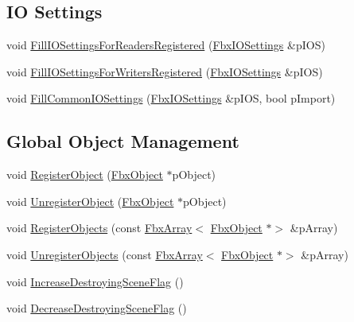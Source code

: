 \subsection*{IO Settings}
\begin{DoxyCompactItemize}
\item 
void \hyperlink{class_fbx_manager_a5af734dedf7cb2c21fc04cfba2265ff3}{Fill\+I\+O\+Settings\+For\+Readers\+Registered} (\hyperlink{class_fbx_i_o_settings}{Fbx\+I\+O\+Settings} \&p\+I\+OS)
\item 
void \hyperlink{class_fbx_manager_aa2cd6f7b73641743427db129ac67d575}{Fill\+I\+O\+Settings\+For\+Writers\+Registered} (\hyperlink{class_fbx_i_o_settings}{Fbx\+I\+O\+Settings} \&p\+I\+OS)
\item 
void \hyperlink{class_fbx_manager_a5d255c3afca682167094c1e78ac1c9aa}{Fill\+Common\+I\+O\+Settings} (\hyperlink{class_fbx_i_o_settings}{Fbx\+I\+O\+Settings} \&p\+I\+OS, bool p\+Import)
\end{DoxyCompactItemize}
\subsection*{Global Object Management}
\begin{DoxyCompactItemize}
\item 
void \hyperlink{class_fbx_manager_a10a8b61fb5b1ba8442c22b5d21a5de53}{Register\+Object} (\hyperlink{class_fbx_object}{Fbx\+Object} $\ast$p\+Object)
\item 
void \hyperlink{class_fbx_manager_a489bd5a18d410b98fcfd87be401c9347}{Unregister\+Object} (\hyperlink{class_fbx_object}{Fbx\+Object} $\ast$p\+Object)
\item 
void \hyperlink{class_fbx_manager_a7a70ec14ac20b239d4fa5e440f70209e}{Register\+Objects} (const \hyperlink{class_fbx_array}{Fbx\+Array}$<$ \hyperlink{class_fbx_object}{Fbx\+Object} $\ast$$>$ \&p\+Array)
\item 
void \hyperlink{class_fbx_manager_ad0efea934848eb58488905b51aa91b38}{Unregister\+Objects} (const \hyperlink{class_fbx_array}{Fbx\+Array}$<$ \hyperlink{class_fbx_object}{Fbx\+Object} $\ast$$>$ \&p\+Array)
\item 
void \hyperlink{class_fbx_manager_ad0c6b924a178ca43748a4e2ee3d6462a}{Increase\+Destroying\+Scene\+Flag} ()
\item 
void \hyperlink{class_fbx_manager_a8967a8b28f427bee9e0737ae8d81cbe2}{Decrease\+Destroying\+Scene\+Flag} ()
\end{DoxyCompactItemize}
